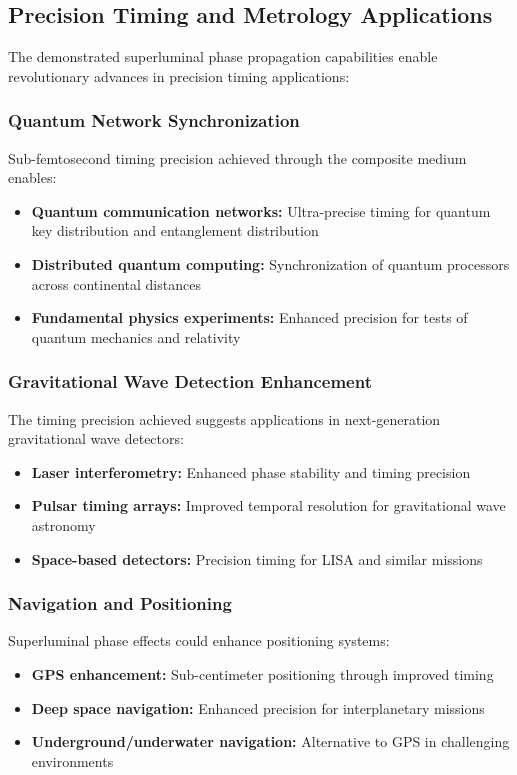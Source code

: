 \documentclass[aps,prl,reprint,groupedaddress,floatfix]{revtex4-1}
\begin{document}
\subsection{Precision Timing and Metrology Applications}

The demonstrated superluminal phase propagation capabilities enable revolutionary advances in precision timing applications:

\subsubsection{Quantum Network Synchronization}

Sub-femtosecond timing precision achieved through the composite medium enables:
\begin{itemize}
    \item \textbf{Quantum communication networks:} Ultra-precise timing for quantum key distribution and entanglement distribution
    \item \textbf{Distributed quantum computing:} Synchronization of quantum processors across continental distances
    \item \textbf{Fundamental physics experiments:} Enhanced precision for tests of quantum mechanics and relativity
\end{itemize}

\subsubsection{Gravitational Wave Detection Enhancement}

The timing precision achieved suggests applications in next-generation gravitational wave detectors:
\begin{itemize}
    \item \textbf{Laser interferometry:} Enhanced phase stability and timing precision
    \item \textbf{Pulsar timing arrays:} Improved temporal resolution for gravitational wave astronomy
    \item \textbf{Space-based detectors:} Precision timing for LISA and similar missions
\end{itemize}

\subsubsection{Navigation and Positioning}

Superluminal phase effects could enhance positioning systems:
\begin{itemize}
    \item \textbf{GPS enhancement:} Sub-centimeter positioning through improved timing
    \item \textbf{Deep space navigation:} Enhanced precision for interplanetary missions
    \item \textbf{Underground/underwater navigation:} Alternative to GPS in challenging environments
\end{itemize}
\end{document}
